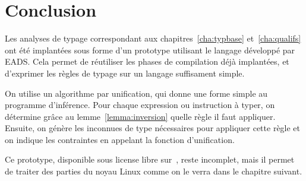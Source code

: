\section*{Conclusion}

Les analyses de typage correspondant aux chapitres~\ref{cha:typbase}
et~\ref{cha:qualifs} ont été implantées sous forme d'un prototype utilisant le
langage \newspeak développé par EADS. Cela permet de réutiliser les phases de
compilation déjà implantées, et d'exprimer les règles de typage sur un langage
suffisament simple.


On utilise un algorithme par unification, qui donne une forme simple au
programme d'inférence. Pour chaque expression ou instruction à typer, on
détermine grâce au lemme~\ref{lemma:inversion} quelle règle il faut appliquer.
Ensuite, on génère les inconnues de type nécessaires pour appliquer cette règle
et on indique les contraintes en appelant la fonction d'unification.

Ce prototype, disponible sous license libre sur~, reste incomplet,
mais il permet de traiter des parties du noyau Linux comme on le verra dans le
chapitre suivant.


